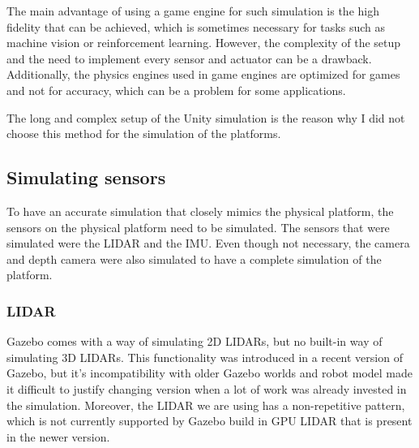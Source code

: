 \documentclass[12pt]{article}
\begin{document}
            The main advantage of using a game engine for such simulation is the high fidelity that can be achieved, which is sometimes necessary for tasks such as machine vision or reinforcement learning. However, the complexity of the setup and the need to implement every sensor and actuator can be a drawback. Additionally, the physics engines used in game engines are optimized for games and not for accuracy, which can be a problem for some applications.

            The long and complex setup of the Unity simulation is the reason why I did not choose this method for the simulation of the platforms.

    \subsection{Simulating sensors}

        To have an accurate simulation that closely mimics the physical platform, the sensors on the physical platform need to be simulated. The sensors that were simulated were the LIDAR and the IMU. Even though not necessary, the camera and depth camera were also simulated to have a complete simulation of the platform.

        \subsubsection{LIDAR}

        Gazebo comes with a way of simulating 2D LIDARs, but no built-in way of simulating 3D LIDARs. This functionality was introduced in a recent version of Gazebo, but it's incompatibility with older Gazebo worlds and robot model made it difficult to justify changing version when a lot of work was already invested in the simulation. Moreover, the LIDAR we are using has a non-repetitive pattern, which is not currently supported by Gazebo build in GPU LIDAR that is present in the newer version. 
        
\end{document}
